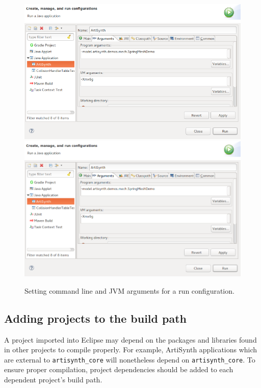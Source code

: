 \begin{figure}
\begin{center}
\iflatexml
\includegraphics[]{images/EclipseRunArgumentsSmall}
\else
\includegraphics[width=5.0in]{images/EclipseRunArguments}
\fi
\end{center}
\caption{Setting command line and JVM arguments for a run configuration.}%
\label{EclipseRunArguments:fig}
\end{figure}


\subsection{Adding projects to the build path}
\label{AddingProjectsToBuildPath}

A project imported into Eclipse may depend on the packages and
libraries found in other projects to compile properly.  For example,
ArtiSynth applications which are external to {\tt artisynth\_core}
will nonetheless depend on {\tt artisynth\_core}. To ensure proper
compilation, project dependencies should be added to each dependent
project's build path.

